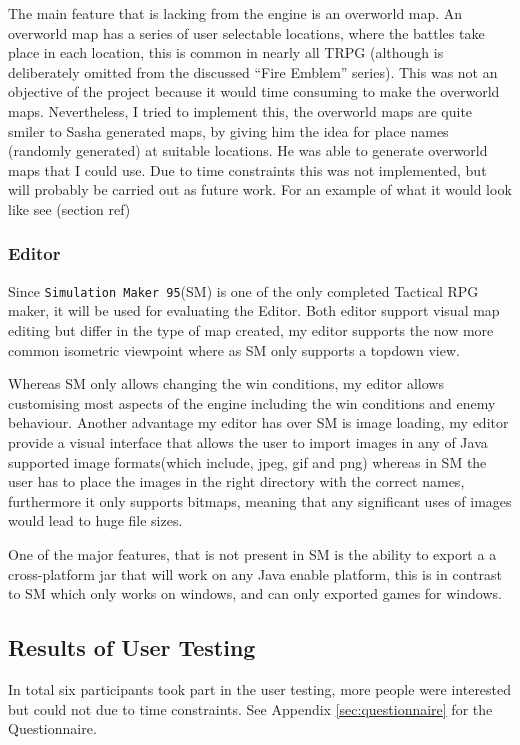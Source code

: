The main feature that is lacking from the engine is an overworld map. An overworld map has a series of user selectable locations, where the battles take place in each location, this is common in nearly all TRPG (although is deliberately omitted from the discussed ``Fire Emblem'' series). This was not an objective of the project because it would time consuming to make the overworld maps. Nevertheless, I tried to implement this, the overworld maps are quite smiler to  Sasha generated maps, by giving him the idea for place names (randomly generated) at suitable locations.  He was able to generate overworld maps that I could use. Due to time constraints this was not implemented, but will probably be carried out as future work. For an example of what it would look like see (section ref)

\subsubsection{Editor}
\label{ssub:editor}
Since \texttt{Simulation Maker 95}(SM) is one of the only completed Tactical RPG maker, it will be used for evaluating the Editor.  Both editor support visual map editing but differ in the type of map created,  my editor supports the now more common isometric viewpoint where as SM only supports a topdown view. 

Whereas SM only allows changing the win conditions, my editor allows customising most aspects of the engine including the win conditions and enemy behaviour.  Another advantage my editor has over SM is image loading, my editor provide a visual interface that allows the user to import images in any of Java supported image formats(which include, jpeg, gif and png) whereas in SM the user has to place the images in the right directory with the correct names, furthermore it only supports bitmaps, meaning that any significant uses of images would lead to huge file sizes.  

One of the major features, that is not present in SM is the ability to export a a cross-platform jar that will work on any Java enable platform, this is in contrast to SM which only works on windows, and can only exported games for windows.

\subsection{Results of User Testing}
\label{sub:results_of_user_testing}

In total six participants took part in the user testing, more people were interested but could not due to time constraints.  See Appendix \ref{sec:questionnaire} for the Questionnaire.

